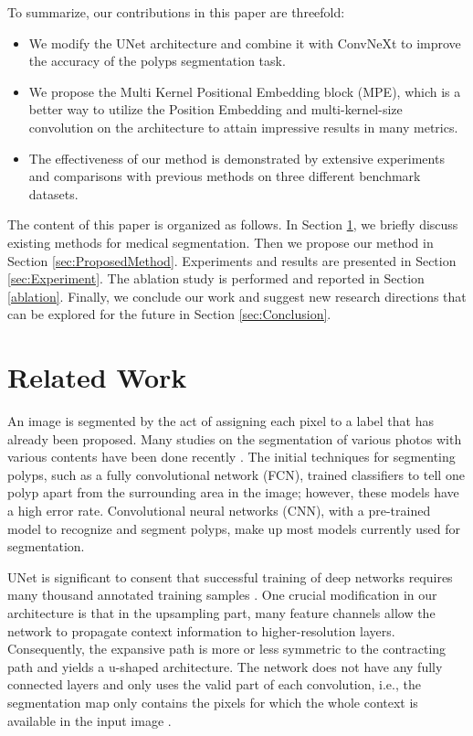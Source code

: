\documentclass[conference]{IEEEtran}
\begin{document}
\pagebreak

To summarize, our contributions in this paper are threefold: 
\begin{itemize}
    \item We modify the UNet architecture and combine it with ConvNeXt to improve the accuracy of the polyps segmentation task.

    \item We propose the Multi Kernel Positional Embedding block (MPE), which is a better way to utilize the Position Embedding and multi-kernel-size convolution on the architecture to attain impressive results in many metrics.

    \item The effectiveness of our method is demonstrated by extensive experiments and comparisons with previous methods on three different benchmark datasets.
\end{itemize}

The content of this paper is organized as follows. In Section \ref{sec:RelatedWork}, we briefly discuss existing methods for medical segmentation. Then we propose our method in Section \ref{sec:ProposedMethod}. Experiments and results are presented in Section \ref{sec:Experiment}. The ablation study is performed and reported in Section \ref{ablation}. Finally, we conclude our work and suggest new research directions that can be explored for the future in Section \ref{sec:Conclusion}.
\section{Related Work}
\label{sec:RelatedWork}

An image is segmented by the act of assigning each pixel to a label that has already been proposed. Many studies on the segmentation of various photos with various contents have been done recently \cite{jha2020medico}. The initial techniques for segmenting polyps, such as a fully convolutional network (FCN), trained classifiers to tell one polyp apart from the surrounding area in the image; however, these models have a high error rate. Convolutional neural networks (CNN), with a pre-trained model to recognize and segment polyps, make up most models currently used for segmentation.

UNet is significant to consent that successful training of deep networks requires many thousand annotated training samples \cite{unet}. One crucial modification in our architecture is that in the upsampling part, many feature channels allow the network to propagate context information to higher-resolution layers. Consequently, the expansive path is more or less symmetric to the contracting path and yields a u-shaped architecture. The network does not have any fully connected layers and only uses the valid part of each convolution, i.e., the segmentation map only contains the pixels for which the whole context is available in the input image \cite{unetexplain}. 
\end{document}
